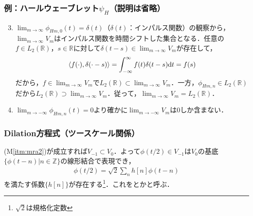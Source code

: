 \documentclass[dvipdfmx,graphicx,14pt]{beamer}
\begin{document}
\begin{frame}[c]
    \frametitle{例：ハールウェーブレット$\psi_{H}$\small（説明は省略）}
    \begin{enumerate}[(M1)]
            \setcounter{enumi}{2}
        \item \small
            $\displaystyle\lim_{m\to\infty} \phi_{Hm,0}(t) = \delta(t)$（$\delta(t)$：インパルス関数）の観察から，$\displaystyle\lim_{m\to\infty}V_{m}$はインパルス関数を時間シフトした集合となる．任意の$f \in L_{2}(\mathbb{R})$，$s \in \mathbb{R}$に対して$\delta(t - s) \in \displaystyle\lim_{m\to\infty}V_{m}$が存在して，
            \begin{align*}
                \langle f(\cdot), \delta(\cdot - s) \rangle = \int_{-\infty}^{\infty} f(t) \delta(t - s) \mathrm{d} t = f(s)
            \end{align*}
            だから，$f \in \displaystyle\lim_{m\to\infty}V_{m}$で$L_{2}(\mathbb{R}) \subset \displaystyle\lim_{m\to\infty}V_{m}$．一方，$\phi_{Hm,n} \in L_{2}(\mathbb{R})$だから$L_{2}(\mathbb{R})\supset \displaystyle\lim_{m\to\infty}V_{m}$．従って，$\displaystyle\lim_{m\to\infty}V_{m} = L_{2}(\mathbb{R})$．
            \normalsize
        \item $\displaystyle\lim_{m\to-\infty} \phi_{Hm,n}(t) = 0$より確かに$\displaystyle\lim_{m\to-\infty}V_{m}$は$0$しか含まない．
    \end{enumerate}
\end{frame}

\begin{frame}[c]
    \frametitle{Dilation方程式（ツースケール関係）}
    (M\ref{itm:mra2})が成立すれば$V_{-1} \subset V_{0}$．よって$\phi(t/2) \in V_{-1}$は$V_{0}$の基底$\{ \phi(t-n) | n \in \mathbb{Z} \}$の線形結合で表現でき，
    \begin{align}
        \phi(t/2) = \sqrt{2} \sum_{n} h[n] \phi(t - n) \label{eq:dilation_eq}
    \end{align}
    を満たす係数$\{ h[n] \}$が存在する\footnote{$\sqrt{2}$は規格化定数}．これをとかと呼ぶ．
\end{frame}
\end{document}
